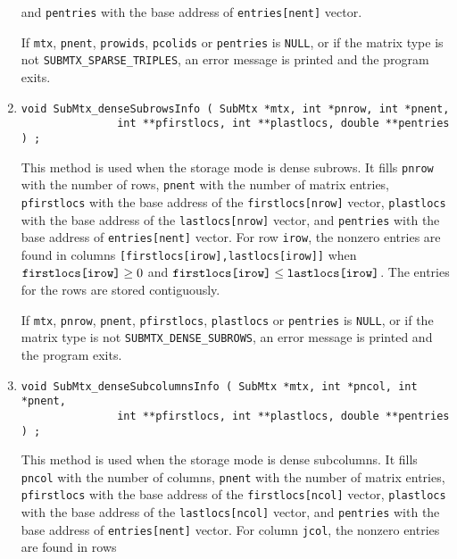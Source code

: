 \begin{enumerate}
and {\tt *pentries} with the base address of {\tt entries[nent]} vector.
\par {}
If {\tt mtx}, {\tt pnent}, {\tt prowids}, {\tt pcolids} or
{\tt pentries} is {\tt NULL},
or if the matrix type is not {\tt SUBMTX\_SPARSE\_TRIPLES},
an error message is printed and the program exits.
\item
\begin{verbatim}
void SubMtx_denseSubrowsInfo ( SubMtx *mtx, int *pnrow, int *pnent, 
               int **pfirstlocs, int **plastlocs, double **pentries ) ;
\end{verbatim}
This method is used when the storage mode is dense subrows.
It fills
{\tt *pnrow} with the number of rows,
{\tt *pnent} with the number of matrix entries,
{\tt *pfirstlocs} with the base address of the {\tt firstlocs[nrow]}
vector,
{\tt *plastlocs} with the base address of the {\tt lastlocs[nrow]}
vector,
and {\tt *pentries} with the base address of {\tt entries[nent]} vector.
For row {\tt irow}, the nonzero entries are found in columns
{\tt [firstlocs[irow],lastlocs[irow]]} 
when $\mbox{\tt firstlocs[irow]} \ge 0$
and $\mbox{\tt firstlocs[irow]} \le \mbox{\tt lastlocs[irow]}$.
The entries for the rows are stored contiguously.
\par {}
If {\tt mtx}, {\tt pnrow}, {\tt pnent}, {\tt pfirstlocs}, 
{\tt plastlocs} or {\tt pentries} is {\tt NULL},
or if the matrix type is not {\tt SUBMTX\_DENSE\_SUBROWS},
an error message is printed and the program exits.
\item
\begin{verbatim}
void SubMtx_denseSubcolumnsInfo ( SubMtx *mtx, int *pncol, int *pnent, 
               int **pfirstlocs, int **plastlocs, double **pentries ) ;
\end{verbatim}
This method is used when the storage mode is dense subcolumns.
It fills
{\tt *pncol} with the number of columns,
{\tt *pnent} with the number of matrix entries,
{\tt *pfirstlocs} with the base address of the {\tt firstlocs[ncol]}
vector,
{\tt *plastlocs} with the base address of the {\tt lastlocs[ncol]}
vector,
and {\tt *pentries} with the base address of {\tt entries[nent]} vector.
For column {\tt jcol}, the nonzero entries are found in rows

\end{enumerate}
